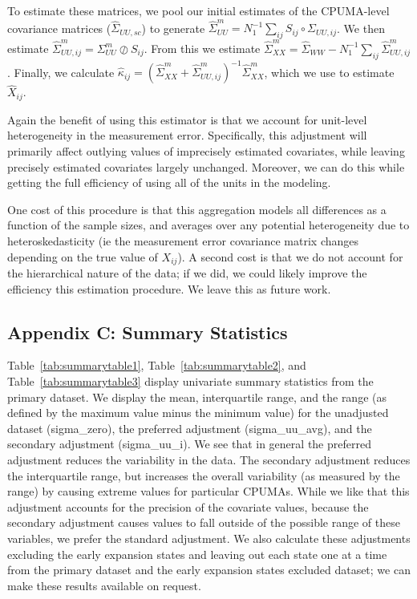 \documentclass[12pt]{article}
\begin{document}
To estimate these matrices, we pool our initial estimates of the CPUMA-level covariance matrices ($\hat{\Sigma}_{UU, sc}$) to generate $\hat{\Sigma}_{UU}^m = N_1^{-1}\sum_{ij} S_{ij} \circ \Sigma_{UU, ij}$. We then estimate $\hat{\Sigma}_{UU, ij}^m = \Sigma_{UU}^m \oslash S_{ij}$. From this we estimate $\hat{\Sigma}^m_{XX} = \hat{\Sigma}_{WW} - N_1^{-1}\sum_{ij}\hat{\Sigma}^m_{UU, ij}$. Finally, we calculate $\hat{\kappa}_{ij} = (\hat{\Sigma}^m_{XX} + \hat{\Sigma}^m_{UU, ij})^{-1}\hat{\Sigma}^m_{XX}$, which we use to estimate $\hat{X}_{ij}$. 

Again the benefit of using this estimator is that we account for unit-level heterogeneity in the measurement error. Specifically, this adjustment will primarily affect outlying values of imprecisely estimated covariates, while leaving precisely estimated covariates largely unchanged. Moreover, we can do this while getting the full efficiency of using all of the units in the modeling. 

One cost of this procedure is that this aggregation models all differences as a function of the sample sizes, and averages over any potential heterogeneity due to heteroskedasticity (ie the measurement error covariance matrix changes depending on the true value of $X_{ij}$). A second cost is that we do not account for the hierarchical nature of the data; if we did, we could likely improve the efficiency this estimation procedure. We leave this as future work.

\subsection{Appendix C: Summary Statistics}

Table~\ref{tab:summarytable1}, Table~\ref{tab:summarytable2}, and Table~\ref{tab:summarytable3} display univariate summary statistics from the primary dataset. We display the mean, interquartile range, and the range (as defined by the maximum value minus the minimum value) for the unadjusted dataset (sigma\_zero), the preferred adjustment (sigma\_uu\_avg), and the secondary adjustment (sigma\_uu\_i). We see that in general the preferred adjustment reduces the variability in the data. The secondary adjustment reduces the interquartile range, but increases the overall variability (as measured by the range) by causing extreme values for particular CPUMAs. While we like that this adjustment accounts for the precision of the covariate values, because the secondary adjustment causes values to fall outside of the possible range of these variables, we prefer the standard adjustment. We also calculate these adjustments excluding the early expansion states and leaving out each state one at a time from the primary dataset and the early expansion states excluded dataset; we can make these results available on request.
\end{document}
